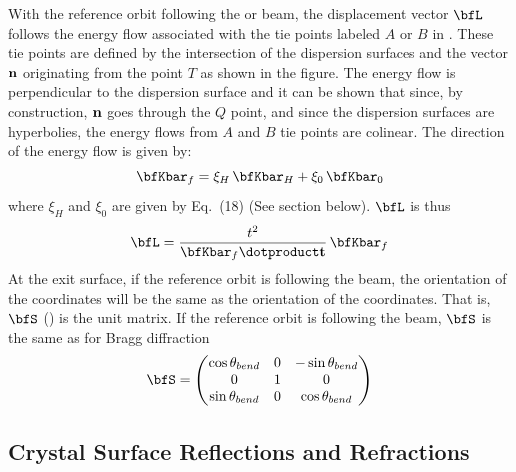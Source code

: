 With the reference orbit following the  or  beam, the
displacement vector $\bfL$ follows the energy flow associated with the tie points labeled $A$ or $B$
in . These tie points are defined by the intersection of the dispersion
surfaces and the vector ${\bf n}$ originating from the point $T$ as shown in the figure.  The energy
flow is perpendicular to the dispersion surface and it can be shown that since, by construction,
${\bf n}$ goes through the $Q$ point, and since the dispersion surfaces are hyperbolies, the energy
flows from $A$ and $B$ tie points are colinear. The direction of the energy flow is given by:
\begin{equation}
  \bfKbar_f = \xi_H \, \bfKbar_H + \xi_0 \, \bfKbar_0
\end{equation}
where $\xi_H$ and $\xi_0$ are given by \cite{b:batterman} Eq.~(18) (See section  below).
$\bfL$ is thus
\begin{equation}
  \bfL = \frac{t^2}{\bfKbar_f \dotproduct \Bf t} \, \bfKbar_f
\end{equation}
At the exit surface, if the reference orbit is following the  beam, the
orientation of the  coordinates will be the same as the orientation of the
 coordinates. That is, $\bfS$ () is the unit matrix.  If the reference
orbit is following the  beam, $\bfS$ is the same as for Bragg diffraction
\begin{equation}
  \bfS = 
  \begin{pmatrix}
    \cos\theta_{bend} & 0 & -\sin\theta_{bend} \\
    0                 & 1 & 0           \\
    \sin\theta_{bend} & 0 & \cos\theta_{bend}
  \end{pmatrix}
\end{equation}

\subsection{Crystal Surface Reflections and Refractions}



